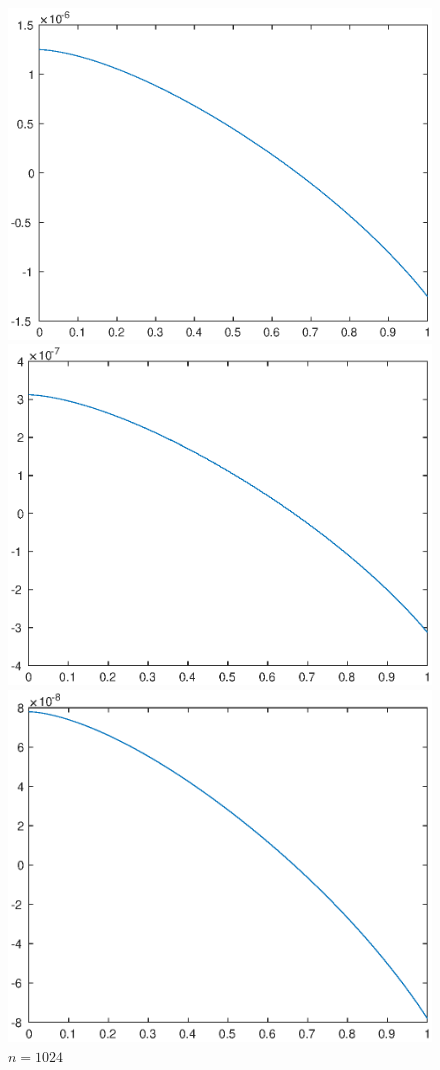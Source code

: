 \documentclass[lang=cn,10pt]{elegantbook}
\begin{document}
\begin{figure}[H]
  \centering
  \begin{minipage}[t]{0.24\linewidth}
      \centering
      \includegraphics[width=0.8\linewidth]{figure/1-2-1.eps}
      \caption*{$n=512$}
  \end{minipage}
  \begin{minipage}[t]{0.24\linewidth}
    \centering
    \includegraphics[width=0.8\linewidth]{figure/1-2-2.eps}
    \caption*{$n=1024$}
  \end{minipage}
  \begin{minipage}[t]{0.24\linewidth}
    \centering
    \includegraphics[width=0.8\linewidth]{figure/1-2-3.eps}

\end{minipage}
\end{figure}
\end{document}
